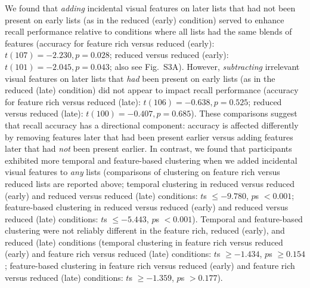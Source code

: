 \documentclass[11pt]{article}
\newcommand{\accuracyByList}{S3}
\begin{document}
We found that \textit{adding} incidental visual features on later lists that
had not been present on early lists (as in the reduced (early) condition)
served to enhance recall performance relative to conditions where all lists had
the same blends of features (accuracy for feature rich versus reduced (early):
$t(107) = -2.230, p = 0.028$; reduced versus reduced (early): $t(101) = -2.045,
p = 0.043$; also see Fig.~\accuracyByList A). However, \textit{subtracting}
irrelevant visual features on later lists that \textit{had} been present on
early lists (as in the reduced (late) condition) did not appear to impact
recall performance (accuracy for feature rich versus reduced (late): $t(106) =
-0.638, p = 0.525$; reduced versus reduced (late): $t(100) = -0.407, p =
0.685$). These comparisons suggest that recall accuracy has a directional
component: accuracy is affected differently by removing features later
that had been present earlier versus adding features later that had
\textit{not} been present earlier. In contrast, we found that participants
exhibited more temporal and feature-based clustering when we added incidental
visual features to \textit{any} lists (comparisons of clustering on feature
rich versus reduced lists are reported above; temporal clustering in reduced
versus reduced (early) and reduced versus reduced (late) conditions: $t$s $\leq
-9.780$, $p$s $< 0.001$; feature-based clustering in reduced versus reduced
(early) and reduced versus reduced (late) conditions: $t$s $\leq -5.443$, $p$s
$< 0.001$). Temporal and feature-based clustering were not reliably different
in the feature rich, reduced (early), and reduced (late) conditions (temporal
clustering in feature rich versus reduced (early) and feature rich versus
reduced (late) conditions: $t$s $\geq -1.434$, $p$s $\geq 0.154$; feature-based
clustering in feature rich versus reduced (early) and feature rich versus
reduced (late) conditions: $t$s $\geq -1.359$, $p$s $> 0.177$).
\end{document}
